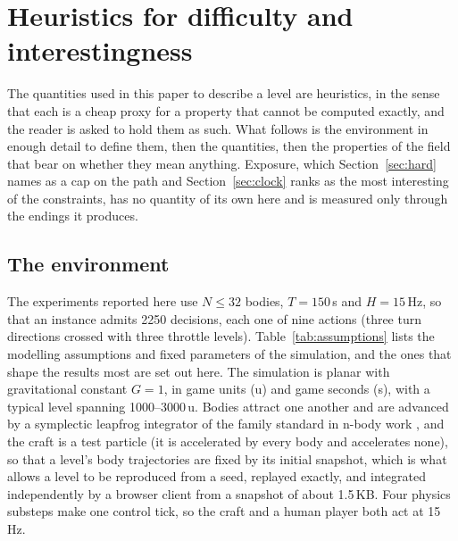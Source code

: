 \documentclass[11pt]{article}
\begin{document}
\section{Heuristics for difficulty and interestingness}
\label{sec:heuristics}

The quantities used in this paper to describe a level are heuristics, in the
sense that each is a cheap proxy for a property that cannot be computed
exactly, and the reader is asked to hold them as such. What follows is the
environment in enough detail to define them, then the quantities, then the
properties of the field that bear on whether they mean anything. Exposure,
which Section~\ref{sec:hard} names as a cap on the path and
Section~\ref{sec:clock} ranks as the most interesting of the constraints,
has no quantity of its own here and is measured only through the endings it
produces.

\subsection{The environment}
\label{sec:env}

The experiments reported here use $N \le 32$ bodies, $T = 150$\,s and
$H = 15$\,Hz, so that an instance admits 2250 decisions, each one of nine
actions (three turn directions crossed with three throttle levels).
Table~\ref{tab:assumptions} lists the modelling assumptions and fixed
parameters of the simulation, and the ones that shape the results most are
set out here. The simulation is planar with gravitational constant $G = 1$,
in game units (u) and game seconds (s), with a typical level spanning
1000--3000\,u. Bodies attract one another and are advanced by a symplectic
leapfrog integrator of the family standard in n-body work
\cite{wisdom1991,rein2015}, and the craft is a test particle (it is
accelerated by every body and accelerates none), so that a level's body
trajectories are fixed by its initial snapshot, which is what allows a level
to be reproduced from a seed, replayed exactly, and integrated independently
by a browser client from a snapshot of about 1.5\,KB. Four physics substeps
make one control tick, so the craft and a human player both act at 15\,Hz.
\end{document}
